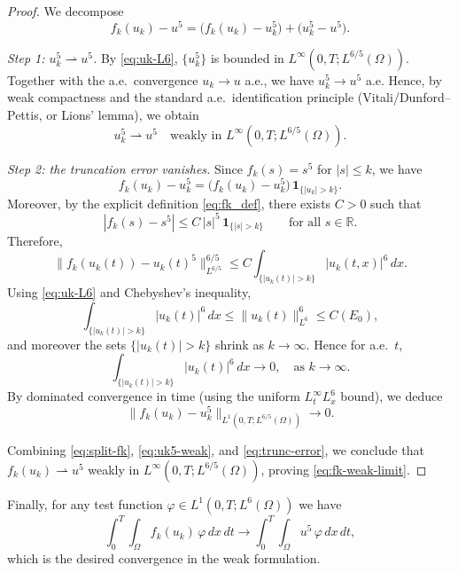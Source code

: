 \documentclass[11pt,letterpaper]{amsart}
\begin{document}
\begin{proof}
We decompose
\begin{equation}\label{eq:split-fk}
f_k(u_k) - u^5 = \big(f_k(u_k)-u_k^5\big) + \big(u_k^5-u^5\big).
\end{equation}

\noindent\emph{Step 1: $u_k^5\rightharpoonup u^5$.}
By \eqref{eq:uk-L6}, $\{u_k^5\}$ is bounded in $L^\infty(0,T;L^{6/5}(\Omega))$.
Together with the a.e.\ convergence $u_k \to u$ a.e., we have $u_k^5\to u^5$ a.e.
Hence, by weak compactness and the standard a.e.\ identification principle
(Vitali/Dunford--Pettis, or Lions' lemma), we obtain
\begin{equation}\label{eq:uk5-weak}
u_k^5 \rightharpoonup u^5 \quad \text{weakly in } L^\infty(0,T;L^{6/5}(\Omega)).
\end{equation}

\noindent\emph{Step 2: the truncation error vanishes.}
Since $f_k(s)=s^5$ for $|s|\le k$, we have
\[
f_k(u_k)-u_k^5 = \big(f_k(u_k)-u_k^5\big)\,\mathbf 1_{\{|u_k|>k\}}.
\]
Moreover, by the explicit definition \eqref{eq:fk_def}, there exists $C>0$ such that
\[
|f_k(s)-s^5|
\le C\,|s|^5\,\mathbf 1_{\{|s|>k\}}
\qquad\text{for all }s\in\mathbb R.
\]
Therefore,
\[
\|f_k(u_k(t))-u_k(t)^5\|_{L^{6/5}}^{6/5}
\le C\int_{\{|u_k(t)|>k\}} |u_k(t,x)|^{6}\,dx.
\]
Using \eqref{eq:uk-L6} and Chebyshev's inequality,
\[
\int_{\{|u_k(t)|>k\}} |u_k(t)|^{6}\,dx
\le \|u_k(t)\|_{L^6}^6 \le C(E_0),
\]
and moreover the sets $\{|u_k(t)|>k\}$ shrink as $k\to\infty$.
Hence for a.e.\ $t$,
\[
\int_{\{|u_k(t)|>k\}} |u_k(t)|^{6}\,dx \longrightarrow 0,
\quad\text{as }k\to\infty.
\]
By dominated convergence in time (using the uniform $L^\infty_tL^6_x$ bound),
we deduce
\begin{equation}\label{eq:trunc-error}
\|f_k(u_k)-u_k^5\|_{L^1(0,T;L^{6/5}(\Omega))} \longrightarrow 0.
\end{equation}

Combining \eqref{eq:split-fk}, \eqref{eq:uk5-weak}, and \eqref{eq:trunc-error},
we conclude that $f_k(u_k)\rightharpoonup u^5$ weakly in
$L^\infty(0,T;L^{6/5}(\Omega))$, proving \eqref{eq:fk-weak-limit}.
\end{proof}

Finally, for any test function $\varphi\in L^1(0,T;L^6(\Omega))$ we have
\[
\int_0^T\!\!\int_\Omega f_k(u_k)\,\varphi\,dx\,dt
\longrightarrow
\int_0^T\!\!\int_\Omega u^5\,\varphi\,dx\,dt,
\]
which is the desired convergence in the weak formulation.


\end{document}
